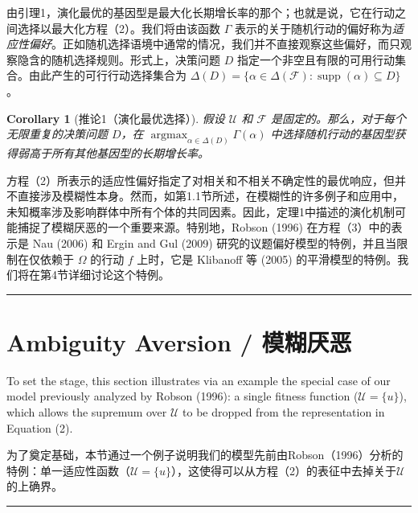 \documentclass[12pt,a4paper]{article}
\newenvironment{original}
  {\par\noindent\color{black}\smallskip}
  {\par\smallskip}
\newenvironment{translation}
  {\par\noindent\color{blue!70!black}\smallskip}
  {\par\medskip\hrule\medskip}
\newtheorem{corollary}[theorem]{Corollary}
\begin{document}
\begin{translation}
由引理1，演化最优的基因型是最大化长期增长率的那个；也就是说，它在行动之间选择以最大化方程（2）。我们将由该函数 $\Gamma$ 表示的关于随机行动的偏好称为\emph{适应性偏好}。正如随机选择语境中通常的情况，我们并不直接观察这些偏好，而只观察隐含的随机选择规则。形式上，决策问题 $D$ 指定一个非空且有限的可用行动集合。由此产生的可行行动选择集合为 $\Delta(D) = \{\alpha \in \Delta(\mathcal{F}) : \operatorname{supp}(\alpha) \subseteq D\}$。

\begin{corollary}[推论1（演化最优选择）]
假设 $\mathcal{U}$ 和 $\mathcal{F}$ 是固定的。那么，对于每个无限重复的决策问题 $D$，在 $\operatorname{argmax}_{\alpha \in \Delta(D)} \Gamma(\alpha)$ 中选择随机行动的基因型获得弱高于所有其他基因型的长期增长率。
\end{corollary}

方程（2）所表示的适应性偏好指定了对相关和不相关不确定性的最优响应，但并不直接涉及模糊性本身。然而，如第1.1节所述，在模糊性的许多例子和应用中，未知概率涉及影响群体中所有个体的共同因素。因此，定理1中描述的演化机制可能捕捉了模糊厌恶的一个重要来源。特别地，Robson (1996) 在方程（3）中的表示是 Nau (2006) 和 Ergin and Gul (2009) 研究的议题偏好模型的特例，并且当限制在仅依赖于 $\Omega$ 的行动 $f$ 上时，它是 Klibanoff 等 (2005) 的平滑模型的特例。我们将在第4节详细讨论这个特例。
\end{translation}

\newpage

\section{Ambiguity Aversion / 模糊厌恶}

\begin{original}
To set the stage, this section illustrates via an example the special case of our model previously analyzed by Robson (1996): a single fitness function ($\mathcal{U} = \{u\}$), which allows the supremum over $\mathcal{U}$ to be dropped from the representation in Equation (2).
\end{original}
\begin{translation}
为了奠定基础，本节通过一个例子说明我们的模型先前由Robson（1996）分析的特例：单一适应性函数（$\mathcal{U} = \{u\}$），这使得可以从方程（2）的表征中去掉关于$\mathcal{U}$的上确界。
\end{translation}
\end{document}
